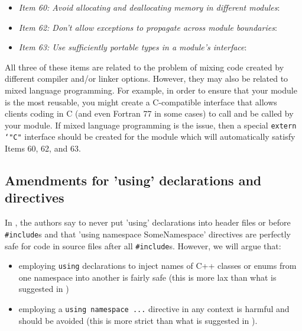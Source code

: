 \begin{itemize}

{}\item\textit{Item 60: Avoid allocating and deallocating memory in different
modules}:

{}\item\textit{Item 62: Don't allow exceptions to propagate across module
boundaries}:

{}\item\textit{Item 63: Use sufficiently portable types in a module's
interface}:

\end{itemize}

All three of these items are related to the problem of mixing code created by
different compiler and/or linker options.  However, they may also be related
to mixed language programming.  For example, in order to ensure that your
module is the most reusable, you might create a C-compatible interface that
allows clients coding in C (and even Fortran 77 in some cases) to call and be
called by your module.  If mixed language programming is the issue, then a
special {}\texttt{extern `"C"} interface should be created for the module
which will automatically satisfy Items 60, 62, and 63.

%
\subsection{Amendments for 'using' declarations and directives}
%

In {}\cite[Item 59]{C++CodingStandards05}, the authors say to never put
'using' declarations into header files or before {}\texttt{\#include}s and
that 'using namespace SomeNamespace' directives are perfectly safe for code in
source files after all {}\texttt{\#include}s.  However, we will argue that:

\begin{itemize}

{}\item{}employing {}\texttt{using} declarations to inject names of C++
classes or enums from one namespace into another is fairly safe (this is more
lax than what is suggested in {}\cite[Item 59]{C++CodingStandards05})

{}\item{}employing a {}\texttt{using namespace ...} directive in any context
is harmful and should be avoided (this is more strict than what is suggested in
{}\cite[Item 59]{C++CodingStandards05}).

\end{itemize}

